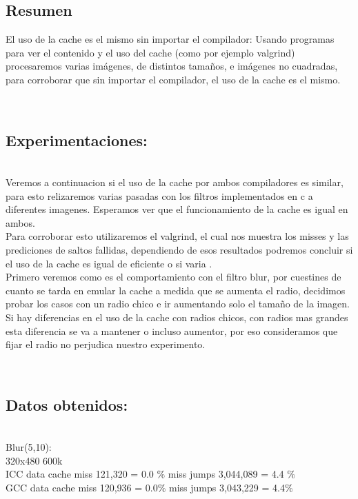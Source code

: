 \subsection{Resumen}

El uso de la cache es el mismo sin importar el compilador: Usando programas para ver el contenido y el uso del cache (como por ejemplo valgrind) procesaremos varias imágenes, de distintos tamaños, e imágenes no cuadradas, para corroborar que sin importar el compilador, el uso de la cache es el mismo.

\\
\subsection{Experimentaciones:}\\

Veremos a continuacion si el uso de la cache por ambos compiladores es similar, para esto relizaremos varias pasadas con los filtros implementados en c a diferentes imagenes. Esperamos ver que el funcionamiento de la cache es igual en ambos. 
\\
Para corroborar esto utilizaremos el valgrind, el cual nos muestra los misses y las  prediciones de saltos fallidas, dependiendo de esos resultados podremos concluir si el uso de la cache es igual de eficiente o si varia .
\\
Primero veremos como es el comportamiento con el filtro blur, por cuestines de cuanto se tarda en emular la cache a medida que se aumenta el radio, decidimos probar los casos con un radio chico e ir aumentando solo el tamaño de la imagen. Si hay diferencias en el uso de la cache con radios chicos, con radios mas grandes esta diferencia se va a mantener o incluso aumentor, por eso consideramos que fijar el radio no perjudica nuestro experimento.

\\
\subsection{Datos obtenidos:}\\

Blur(5,10): \\

320x480 600k \\
ICC    data cache miss  121,320 = 0.0 $\%$ miss jumps  3,044,089 = 4.4 $\%$  \\
GCC  data cache miss 120,936 = 0.0$\%$ miss jumps   3,043,229 = 4.4$\%$  \\ 

